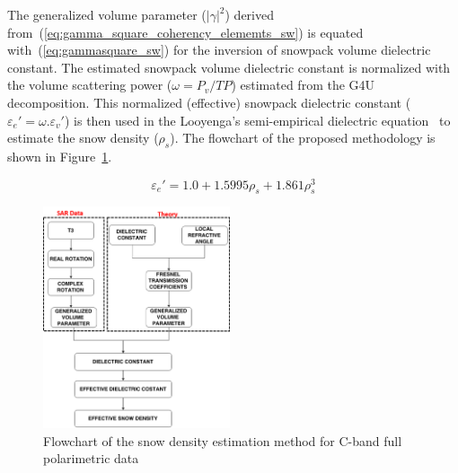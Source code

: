 The generalized volume parameter ($|\gamma|^2$) derived from~(\ref{eq:gamma_square_coherency_elememts_sw}) is equated with~(\ref{eq:gammasquare_sw}) for the inversion of snowpack volume dielectric constant. The estimated snowpack volume dielectric constant is normalized with the volume scattering power ($\omega=P_v/TP$) estimated from the G4U decomposition. This normalized (effective) snowpack dielectric constant ($\varepsilon_{e}{'}=\omega.\varepsilon_{v}{'}$) is then used in the Looyenga's semi-empirical dielectric equation~\citep{looyenga1965dielectric} to estimate the snow density ($\rho_s$). The flowchart of the proposed methodology is shown in Figure~\ref{fig:methodology}. 

\begin{equation}
\varepsilon_{e}{'}=1.0 + 1.5995\rho_s + 1.861\rho_s^{3}
\label{eq:looyenga}
\end{equation}

\begin{figure}
	\centering
	\includegraphics[width=0.49\textwidth]{Figures_sd/flow_chart}
	\caption [Flowchart of snow density estimation algorithm]{Flowchart of the snow density estimation method for C-band full polarimetric data}
	\label{fig:methodology}
\end{figure}


